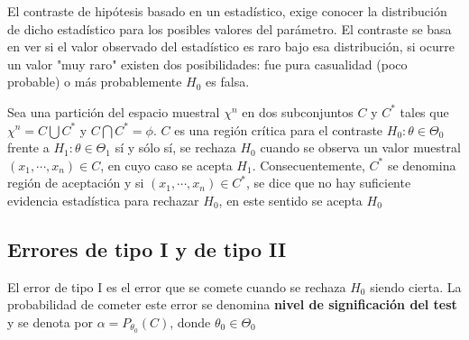 
\begin{observación}
    El contraste de hipótesis basado en un estadístico, exige conocer la distribución de dicho estadístico para los posibles valores del parámetro. El contraste se basa en ver si el valor observado del estadístico es raro bajo esa distribución, si ocurre un valor "muy raro" existen dos posibilidades: fue pura casualidad (poco probable) o más probablemente $H_0$ es falsa. 
\end{observación}

\begin{definición} 
    Sea una partición del espacio muestral $\chi^{n}$ en dos subconjuntos $C$ y $C^{*}$ tales que $\chi^{n}=C \bigcup C^{*}$ y $C \bigcap C^{*}=\phi$. $C$ es una región crítica para el contraste $H_{0}: \theta \in \Theta_{0}$ frente a $H_{1}: \theta \in \Theta_{1}$ sí y sólo sí, se rechaza $H_{0}$ cuando se observa un valor muestral $\left(x_{1}, \cdots, x_{n}\right) \in C$, en cuyo caso se acepta $H_{1}$. Consecuentemente, $C^{*}$ se denomina región de aceptación y si $\left(x_{1}, \cdots, x_{n}\right) \in C^{*}$, se dice que no hay suficiente evidencia estadística para rechazar $H_{0}$, en este sentido se acepta $H_{0}$
\end{definición}

\subsection{Errores de tipo I y de tipo II}
\begin{definición}
    El error de tipo I es el error que se comete cuando se rechaza $H_{0}$ siendo cierta. La probabilidad de cometer este error se denomina \textbf{nivel de significación del test} y se denota por $\alpha=P_{\theta_{0}}(C)$, donde $\theta_{0} \in \Theta_{0}$
\end{definición}

